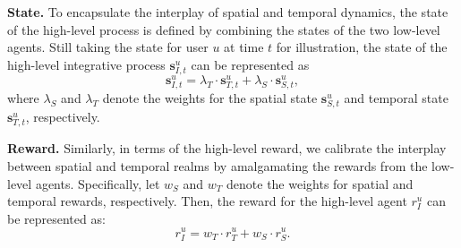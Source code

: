 \documentclass[letterpaper]{article} %
\begin{document}
\noindent\textbf{State.}
To encapsulate the interplay of spatial and temporal dynamics, the state of the high-level process is defined by combining the states of the two low-level agents.
Still taking the state for user $u$ at time $t$ for illustration, the state of the high-level integrative process $\mathbf{s}_{I,t}^{u}$ can be represented as
\begin{equation}
    \mathbf{s}_{I,t}^{u} = \lambda_{T} \cdot \mathbf{s}_{T,t}^{u} + \lambda_{S} \cdot \mathbf{s}_{S,t}^{u},
\label{equ: high level state}
\end{equation}
where $\lambda_S$ and $\lambda_T$ denote the weights for the spatial state $\mathbf{s}_{S,t}^{u}$ and temporal state $\mathbf{s}_{T,t}^{u}$, respectively.

\noindent\textbf{Reward.}
Similarly, in terms of the high-level reward, we calibrate the interplay between spatial and temporal realms by amalgamating the rewards from the low-level agents.
Specifically, let $w_{S}$ and $w_{T}$ denote the weights for spatial and temporal rewards, respectively.
Then, the reward for the high-level agent $r_{I}^{u}$ can be represented as:
\begin{equation}
    r^{u}_I = w_{T} \cdot r_{T}^{u} + w_{S} \cdot r_{S}^{u}.
\label{equ: high-level reward}
\end{equation}
\end{document}
